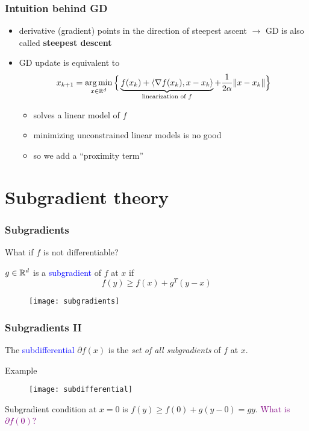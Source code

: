\documentclass{beamer}
\begin{document}
\begin{frame}
  \frametitle{Intuition behind GD}
  \begin{itemize}
    \item derivative (gradient) points in the direction of steepest ascent
          $\rightarrow$ GD is also called \textbf{steepest descent}
    \item GD update is equivalent to
          \begin{equation}
            x_{k+1} = \operatorname*{arg\,min}_{x\in \mathbb{R}^d} \Big\{ \underbrace{f(x_k) + \langle \nabla f(x_k), x-x_k \rangle }_{\text{linearization of $f$}}+ \frac{1}{2 \alpha} \Vert x-x_k \Vert\Big\}
          \end{equation}
          \begin{itemize}
            \item solves a linear model of $f$
            \item minimizing unconstrained linear models is no good
            \item so we add a ``proximity term''
          \end{itemize}
  \end{itemize}
\end{frame}


\section{Subgradient theory}%

\begin{frame}
  \frametitle{Subgradients}
  What if $f$ is not differentiable?
  \begin{definition}
    $g \in \mathbb{R}^d$ is a \textcolor{blue}{subgradient} of $f$ at $x$ if
    \begin{equation}
      f(y) \ge f(x) + g^T (y-x)
    \end{equation}
  \end{definition}
  \begin{figure}[ht]
    \centering
    \texttt{[image: subgradients]}
  \end{figure}
\end{frame}

\begin{frame}
  \frametitle{Subgradients II}
  \begin{definition}
    The \textcolor{blue}{subdifferential} $\partial f(x)$ is the \emph{set of all subgradients} of $f$ at $x$.
  \end{definition}
  Example
  \begin{figure}[ht]
    \centering
    \texttt{[image: subdifferential]}
  \end{figure}
  Subgradient condition at $x=0$ is $f(y)\ge f(0) + g(y-0) = gy$.
  \textcolor{purple}{What is $\partial f(0)$?}
\end{frame}
\end{document}

